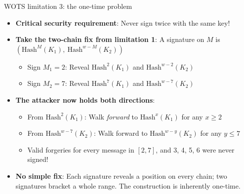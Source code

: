 \ifdefined\PRESENTATION\else\PassOptionsToClass{handout}{beamer}\fi\documentclass[aspectratio=169, lualatex]{beamer}
\begin{document}
\begin{frame}{WOTS limitation 3: the one-time problem}
	\begin{itemize}
		\item \textbf{Critical security requirement}: Never sign twice with the same key!
		\item \textbf{Take the two-chain fix from limitation 1}: A signature on $M$ is $(\text{Hash}^M(K_1),\ \text{Hash}^{w-M}(K_2))$
		      \begin{itemize}
			      \item Sign $M_1 = 2$: Reveal $\text{Hash}^2(K_1)$ and $\text{Hash}^{w-2}(K_2)$
			      \item Sign $M_2 = 7$: Reveal $\text{Hash}^7(K_1)$ and $\text{Hash}^{w-7}(K_2)$
		      \end{itemize}
		\item \textbf{The attacker now holds both directions}:
		      \begin{itemize}
			      \item From $\text{Hash}^2(K_1)$: Walk \textit{forward} to $\text{Hash}^x(K_1)$ for any $x \geq 2$
			      \item From $\text{Hash}^{w-7}(K_2)$: Walk forward to $\text{Hash}^{w-y}(K_2)$ for any $y \leq 7$
			      \item Valid forgeries for every message in $[2, 7]$, and 3, 4, 5, 6 were never signed!
		      \end{itemize}
		\item \textbf{No simple fix}: Each signature reveals a position on every chain; two signatures bracket a whole range. The construction is inherently one-time.
	\end{itemize}
\end{frame}
\end{document}
